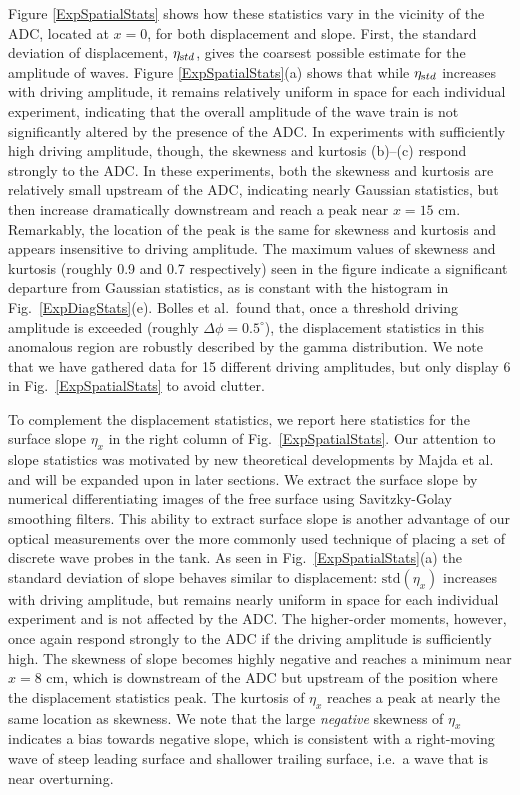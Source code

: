 \documentclass[11pt]{article}
\newcommand{\etastd}{\eta_{\text std}}
\newcommand{\std}{\text{std}}
\newcommand{\Dphi}{\Delta \phi}
\begin{document}
	Figure \ref{ExpSpatialStats} shows how these statistics vary in the vicinity of the ADC, located at $x = 0$, for both displacement and slope. First, the standard deviation of displacement, $\etastd$, gives the coarsest possible estimate for the amplitude of waves. Figure \ref{ExpSpatialStats}(a) shows that while $\etastd$ increases with driving amplitude, it remains relatively uniform in space for each individual experiment, indicating that the overall amplitude of the wave train is not significantly altered by the presence of the ADC. In experiments with sufficiently high driving amplitude, though, the skewness and kurtosis (b)--(c) respond strongly to the ADC. In these experiments, both the skewness and kurtosis are relatively small upstream of the ADC, indicating nearly Gaussian statistics, but then increase dramatically downstream and reach a peak near $x = 15$ cm. Remarkably, the location of the peak is the same for skewness and kurtosis and appears insensitive to driving amplitude. The maximum values of skewness and kurtosis (roughly 0.9 and 0.7 respectively) seen in the figure indicate a significant departure from Gaussian statistics, as is constant with the histogram in Fig.~\ref{ExpDiagStats}(e). Bolles et al.~found that, once a threshold driving amplitude is exceeded (roughly $\Dphi = 0.5^{\circ}$), the displacement statistics in this anomalous region are robustly described by the gamma distribution. We note that we have gathered data for 15 different driving amplitudes, but only display 6 in Fig.~\ref{ExpSpatialStats} to avoid clutter. 

	To complement the displacement statistics, we report here statistics for the surface slope $\eta_x$ in the right column of Fig.~\ref{ExpSpatialStats}. Our attention to slope statistics was motivated by new theoretical developments by Majda et al.~\cite{majda2019} and will be expanded upon in later sections. We extract the surface slope by numerical differentiating images of the free surface using Savitzky-Golay smoothing filters. This ability to extract surface slope is another advantage of our optical measurements over the more commonly used technique of placing a set of discrete wave probes in the tank. As seen in Fig.~\ref{ExpSpatialStats}(a) the standard deviation of slope behaves similar to displacement: $\std(\eta_x)$ increases with driving amplitude, but remains nearly uniform in space for each individual experiment and is not affected by the ADC. The higher-order moments, however, once again respond strongly to the ADC if the driving amplitude is sufficiently high. The skewness of slope becomes highly negative and reaches a minimum near $x = 8$ cm, which is downstream of the ADC but upstream of the position where the displacement statistics peak. The kurtosis of $\eta_x$ reaches a peak at nearly the same location as skewness. We note that the large {\em negative} skewness of $\eta_x$ indicates a bias towards negative slope, which is consistent with a right-moving wave of steep leading surface and shallower trailing surface, i.e.~a wave that is near overturning.
\end{document}
